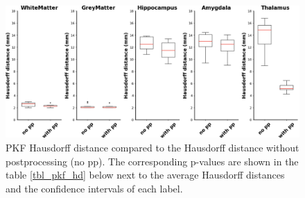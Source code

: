 \documentclass[journal]{IEEEtran}
\begin{document}
\begin{figure}[ht]
\centering
\includegraphics[width=\textwidth]{MIALab_Report/img/boxplots/PKF-HD.png}
\caption{PKF Hausdorff distance compared to the Hausdorff distance without postprocessing (no pp). The corresponding p-values are shown in the table \ref{tbl_pkf_hd} below next to the average Hausdorff distances and the confidence intervals of each label.}
\label{fig_pkf-hd}
\end{figure}
\end{document}
